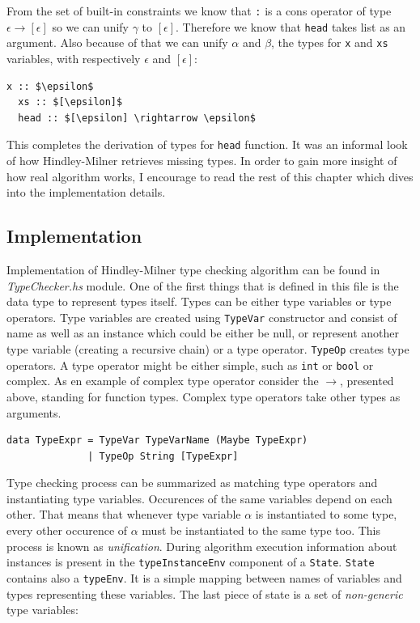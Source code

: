 \documentclass[12pt,a4paper]{report}
\begin{document}
From the set of built-in constraints we know that \texttt{:} is a cons operator
of type $\epsilon \rightarrow [\epsilon]$ so we can unify $\gamma$ to
$[\epsilon]$. Therefore we know that \texttt{head} takes list as an argument.
Also because of that we can unify $\alpha$ and $\beta$, the types for
\texttt{x} and \texttt{xs} variables, with respectively $\epsilon$ and
$[\epsilon]$:

\vspace*{0.2in}
\begin{lstlisting}[mathescape=true,style=haskell]
  x :: $\epsilon$
  xs :: $[\epsilon]$
  head :: $[\epsilon] \rightarrow \epsilon$
\end{lstlisting}

This completes the derivation of types for \texttt{head} function. It was an
informal look of how Hindley-Milner retrieves missing types. In order to gain
more insight of how real algorithm works, I encourage to read the rest of this
chapter which dives into the implementation details.

\subsection{Implementation}
Implementation of Hindley-Milner type checking algorithm can be found in
\textit{TypeChecker.hs} module. One of the first things that is defined in this
file is the data type to represent types itself. Types can be either type
variables or type operators. Type variables are created using \texttt{TypeVar}
constructor and consist of name as well as an instance which could be either be
null, or represent another type variable (creating a recursive chain) or a type
operator. \texttt{TypeOp} creates type operators. A type operator might
be either simple, such as \texttt{int} or \texttt{bool} or complex. As en
example of complex type operator consider the $\rightarrow$, presented
above, standing for function types. Complex type operators take other types as
arguments.

\vspace*{0.2in}
\begin{lstlisting}
data TypeExpr = TypeVar TypeVarName (Maybe TypeExpr)
              | TypeOp String [TypeExpr]
\end{lstlisting}

Type checking process can be summarized as matching type operators and
instantiating type variables. Occurences of the same variables depend on each
other. That means that whenever type variable $\alpha$ is instantiated to some
type, every other occurence of $\alpha$ must be instantiated to the same type
too. This process is known as \textit{unification}. During algorithm execution
information about instances is present in the \texttt{typeInstanceEnv}
component of a \texttt{State}. \texttt{State} contains also a \texttt{typeEnv}.
It is a simple mapping between names of variables and types representing these
variables. The last piece of state is a set of \textit{non-generic} type
variables:
\end{document}
